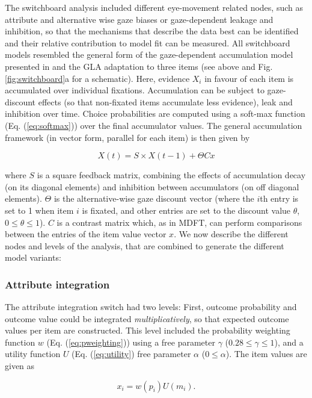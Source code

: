 \documentclass[11pt, a4paper]{article}
\begin{document}
The switchboard analysis included different eye-movement related nodes, such as attribute and alternative wise gaze biases or gaze-dependent leakage and inhibition, so that the mechanisms that describe the data best can be identified and their relative contribution to model fit can be measured. All switchboard models resembled the general form of the gaze-dependent accumulation model presented in \textcite{glickman2019FormationPreferenceRisky} and the GLA adaptation to three items (see above and Fig. \ref{fig:switchboard}a for a schematic). Here, evidence $X_i$ in favour of each item is accumulated over individual fixations. Accumulation can be subject to gaze-discount effects (so that non-fixated items accumulate less evidence), leak and inhibition over time. Choice probabilities are computed using a soft-max function (Eq. (\ref{eq:softmax})) over the final accumulator values. The general accumulation framework (in vector form, parallel for each item) is then given by

\begin{equation}
  X(t) = S \times X(t-1) + \Theta C x
\end{equation}

where $S$ is a square feedback matrix, combining the effects of accumulation decay (on its diagonal elements) and inhibition between accumulators (on off diagonal elements). $\Theta$ is the alternative-wise gaze discount vector (where the $i$th entry is set to 1 when item $i$ is fixated, and other entries are set to the discount value $\theta$, $0 \le \theta \le 1$). $C$ is a contrast matrix which, as in MDFT, can perform comparisons between the entries of the item value vector $x$.
We now describe the different nodes and levels of the analysis, that are combined to generate the different model variants:

\subsubsection*{Attribute integration}
The attribute integration switch had two levels:
First, outcome probability and outcome value could be integrated \emph{multiplicatively}, so that expected outcome values per item are constructed. This level included the probability weighting function $w$ (Eq. (\ref{eq:pweighting})) using a free parameter $\gamma$ ($0.28 \le \gamma \le 1$), and a utility function $U$ (Eq. (\ref{eq:utility}) free parameter $\alpha$ ($0 \le \alpha$).
The item values are given as

\begin{equation}
x_i = w(p_i) U(m_i).
\end{equation}
\end{document}
